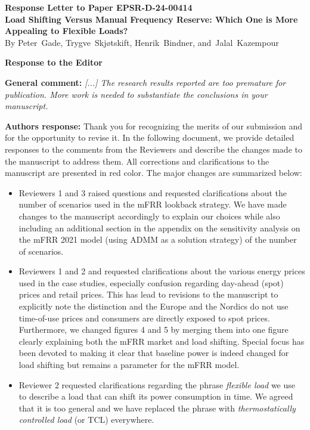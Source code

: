 \documentclass[10pt]{article}
\newcommand{\nt}[1]{\textcolor{newtextcolor}{#1}}
\newcommand{\auth}{\textbf{Authors response: }}
\begin{document}
\begin{center}
  \Large{\textbf{Response Letter to Paper EPSR-D-24-00414 \\ Load Shifting Versus Manual Frequency Reserve: Which One is More Appealing to Flexible Loads?}} \\
  \vspace{0.2cm}
  \small{By Peter~Gade,
    Trygve~Skjøtskift,
    Henrik~Bindner,
    and~Jalal~Kazempour} \\
\end{center}

\begingroup
\allowdisplaybreaks


\textbf{\large{Response to the Editor}}


\textbf{General comment:} \textit{[...] The research results reported are too premature for publication. More work is needed to substantiate the conclusions in your manuscript.}

\auth Thank you for recognizing the merits of our submission and for the opportunity to revise it. In the following document, we provide detailed responses to the comments from the Reviewers and describe the changes made to the manuscript to address them. All corrections and clarifications to the manuscript are presented in \nt{red} color. The major changes are summarized below:

\begin{itemize}
  \item Reviewers 1 and 3 raised questions and requested clarifications about the number of scenarios used in the mFRR lookback strategy. We have made changes to the manuscript accordingly to explain our choices while also including an additional section in the appendix on the sensitivity analysis on the mFRR 2021 model (using ADMM as a solution strategy) of the number of scenarios.

  \item Reviewers 1 and 2 and requested clarifications about the various energy prices used in the case studies, especially confusion regarding day-ahead (spot) prices and retail prices. This has lead to revisions to the manuscript to explicitly note the distinction and the Europe and the Nordics do not use time-of-use prices and consumers are directly exposed to spot prices. Furthermore, we changed figures 4 and 5 by merging them into one figure clearly explaining both the mFRR market and load shifting. Special focus has been devoted to making it clear that baseline power is indeed changed for load shifting but remains a parameter for the mFRR model.

  \item Reviewer 2 requested clarifications regarding the phrase \textit{flexible load} we use to describe a load that can shift its power consumption in time. We agreed that it is too general and we have replaced the phrase with \textit{thermostatically controlled load} (or TCL) everywhere.
\end{itemize}
\end{document}
